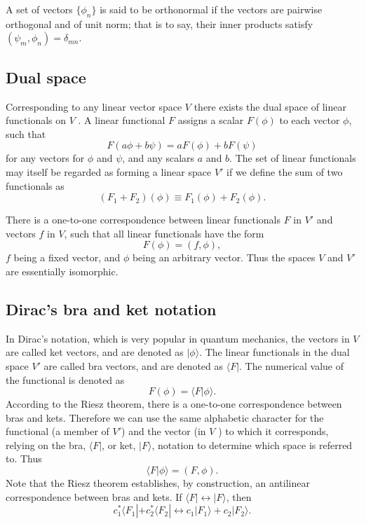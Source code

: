 \begin{newdef}[Orthonormal]
A set of vectors $\{\phi_n\}$ is said to be orthonormal if the vectors are pairwise orthogonal and of unit norm; that is to say, their inner products satisfy $(\psi_m,\phi_n) = \delta_{mn}$.
\end{newdef}

\subsection{Dual space}
\begin{newdef}
Corresponding to any linear vector space $V$ there exists the dual space of linear functionals on $V$ . A linear functional $F$ assigns a scalar $F(\phi)$ to each vector $\phi$, such that
\[F(a\phi+b\psi) = aF(\phi) + bF(\psi) \]
for any vectors for $\phi$ and $\psi$, and any scalars $a$ and $b$. The set of linear functionals may itself be regarded as forming a linear space $V'$ if we define the sum of two functionals as
\[(F_1+F_2)(\phi) \equiv F_1(\phi) + F_2(\phi).\]
\end{newdef}

\begin{newthem} 
There is a one-to-one correspondence between linear functionals $F$ in $V'$ and vectors $f$ in $V$, such that all linear functionals have the form
\[F(\phi) = (f,\phi),\]
$f$ being a fixed vector, and $\phi$ being an arbitrary vector. Thus the spaces $V$ and $V'$ are essentially isomorphic.
\end{newthem}

\subsection{Dirac's bra and ket notation}
\noindent
In Dirac's notation, which is very popular in quantum mechanics, the vectors in $V$ are called ket vectors, and are denoted as $|\phi \rangle$. The linear functionals in the dual space $V'$ are called bra vectors, and are denoted as $\langle F |$. The numerical value of the functional is denoted as
\[F(\phi) = \langle F | \phi \rangle.\]
According to the Riesz theorem, there is a one-to-one correspondence between bras and kets. Therefore we can use the same alphabetic character for the functional (a member of $V'$) and the vector (in $V$ ) to which it corresponds, relying on the bra, $\langle F |$, or ket, $|F\rangle$, notation to determine which space is referred to. Thus
\[\langle F | \phi \rangle = (F,\phi).\]
Note that the Riesz theorem establishes, by construction, an antilinear correspondence between bras and kets. If $\langle F | \leftrightarrow  |F\rangle$, then
\[c_1^* \langle F_1 | + c_2^* \langle F_2 | \leftrightarrow  c_1 |F_1\rangle + c_2|F_2\rangle.\]

